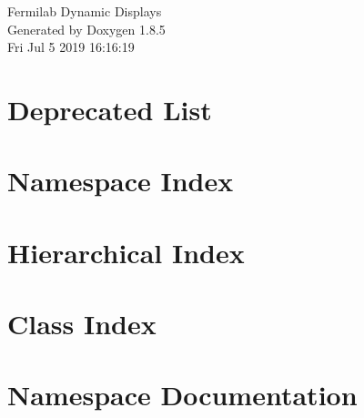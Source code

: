 \documentclass[twoside]{book}
\newcommand{\clearemptydoublepage}{%
  \newpage{\pagestyle{empty}\cleardoublepage}%
}
\begin{document}
\hypersetup{pageanchor=false}
\begin{titlepage}
\vspace*{7cm}
\begin{center}%
{\Large Fermilab Dynamic Displays }\\
\vspace*{1cm}
{\large Generated by Doxygen 1.8.5}\\
\vspace*{0.5cm}
{\small Fri Jul 5 2019 16:16:19}\\
\end{center}
\end{titlepage}
\clearemptydoublepage
\tableofcontents
\clearemptydoublepage
{}
\hypersetup{pageanchor=true}

\chapter{Deprecated List}
\label{deprecated}
\hypertarget{deprecated}{}

\chapter{Namespace Index}

\chapter{Hierarchical Index}

\chapter{Class Index}

\chapter{Namespace Documentation}




















\end{document}
